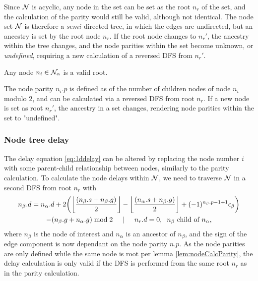 Since $\mathcal{N}$ is acyclic, any node in the set can be set as the root $n_r$ of the set, and the calculation of the parity would still be valid, although not identical. The node set $\mathcal{N}$ is therefore a $semi$-directed tree, in which the edges are undirected, but an ancestry is set by the root node $n_r$. If the root node changes to $n_{r}'$, the ancestry within the tree changes, and the node parities within the set become unknown, or \emph{undefined}, requiring a new calculation of a reversed DFS from $n_{r}'$.

\begin{lemma}\label{lem:anynoderoot}
  Any node $n_i \in \mathcal{N}_\alpha$ is a valid root.
\end{lemma}

\begin{lemma}\label{lem:nodeCalcParity}
  The node parity $n_i.p$ is defined as of the number of children nodes of node $n_i$ modulo 2, and can be calculated via a reversed DFS from root $n_r$. If a new node is set as root $n_r'$, the ancestry in a set changes, rendering node parities within the set to "undefined".
\end{lemma}

\subsubsection{Node tree delay}

The delay equation \ref{eq:1ddelay} can be altered by replacing the node number $i$ with some parent-child relationship between nodes, similarly to the parity calculation. To calculate the node delays within $\mathcal{N}$, we need to traverse $\mathcal{N}$ in a second DFS from root $n_r$ with
\begin{multline}\label{eq:2ddelay}
  n_\beta.d = n_\alpha.d + 2\bigg({\left \lfloor \frac{(n_\beta.s+n_\beta.g)}{2} \right \rfloor } - {\left \lfloor \frac{(n_\alpha.s+n_\beta.g)}{2} \right \rfloor } + (-1)^{n_\beta.p-1+1}\epsilon_\beta\bigg) \\
         - (n_\beta.g + n_\alpha.g)\bmod 2 \hspace{.5cm} | \hspace{.5cm} n_r.d = 0, \hspace{.2cm} n_\beta \mbox{ child of } n_\alpha,
\end{multline}
where $n_\beta$ is the node of interest and $n_\alpha$ is an ancestor of $n_\beta$, and the sign of the edge component is now dependant on the node parity $n.p$. As the node parities are only defined while the same node is root per lemma \ref{lem:nodeCalcParity}, the delay calculation is only valid if the DFS is performed from the same root $n_r$ as in the parity calculation.

